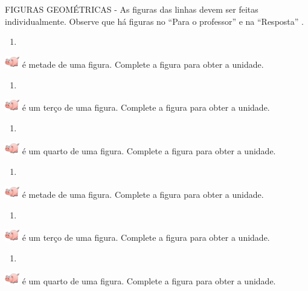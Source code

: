 \documentclass[a4,12pt]{book}
\begin{document}
\begin{imagem*}[breakable]{}{}   FIGURAS GEOMÉTRICAS - As figuras das linhas devem ser feitas individualmente. Observe que há figuras no   ``Para o professor''   e na   ``Resposta''  .
\end{imagem*}
\begin{enumerate} [\quad a)] %
  \item
\end{enumerate} %
\includegraphics[width=18pt, keepaspectratio]{pig} é metade de uma figura. Complete a figura para obter a unidade.
\begin{enumerate} [\quad a)] %
  \item
\end{enumerate} %
\includegraphics[width=18pt, keepaspectratio]{pig} é um terço de uma figura. Complete a figura para obter a unidade.
\begin{enumerate} [\quad a)] %
  \item
\end{enumerate} %
\includegraphics[width=18pt, keepaspectratio]{pig} é um quarto de uma figura. Complete a figura para obter a unidade.
\begin{enumerate} [\quad a)] %
  \item
\end{enumerate} %
\includegraphics[width=18pt, keepaspectratio]{pig} é metade de uma figura. Complete a figura para obter a unidade.
\begin{enumerate} [\quad a)] %
  \item
\end{enumerate} %
\includegraphics[width=18pt, keepaspectratio]{pig} é um terço de uma figura. Complete a figura para obter a unidade.
\begin{enumerate} [\quad a)] %
  \item
\end{enumerate} %
\includegraphics[width=18pt, keepaspectratio]{pig} é um quarto de uma figura. Complete a figura para obter a unidade.
\end{document}
